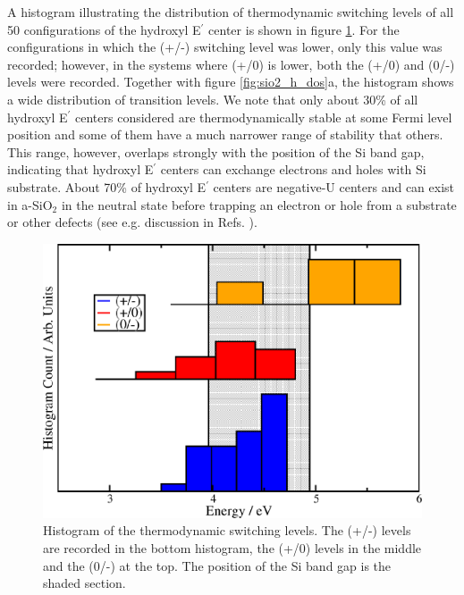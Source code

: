\documentclass[aps,prb,reprint,superscriptaddress,showpacs]{revtex4-1}
\begin{document}
A histogram illustrating the distribution of thermodynamic switching levels of all 50 configurations of the hydroxyl E$^\prime$ center is shown in figure \ref{fig:hydroxy_thermodynamic_levels}. For the configurations in which the (+/-) switching level was lower, only this value was recorded; however, in the systems where (+/0) is lower, both the (+/0) and (0/-) levels were recorded. Together with figure \ref{fig:sio2_h_dos}a, the histogram shows a wide distribution of transition levels. We note that only about 30\% of all hydroxyl E$^\prime$ centers considered are thermodynamically stable at some Fermi level position and some of them have a much narrower range of stability that others. This range, however, overlaps strongly with the position of the Si band gap, indicating that hydroxyl E$^\prime$ centers can exchange electrons and holes with Si substrate. About 70\% of hydroxyl E$^\prime$ centers are negative-U centers and can exist in a-SiO$_2$ in the neutral state before trapping an electron or hole from a substrate or other defects (see e.g. discussion in Refs. \cite{shkrob1,shkrob2}).  

\begin{figure}[h!]
\includegraphics{thermodynamic_levels4.png}
\caption{Histogram of the thermodynamic switching levels. The (+/-) levels are recorded in the bottom histogram, the (+/0) levels in the middle and the (0/-) at the top. The position of the Si band gap is the shaded section.}
\label{fig:hydroxy_thermodynamic_levels}
\end{figure}
\end{document}
